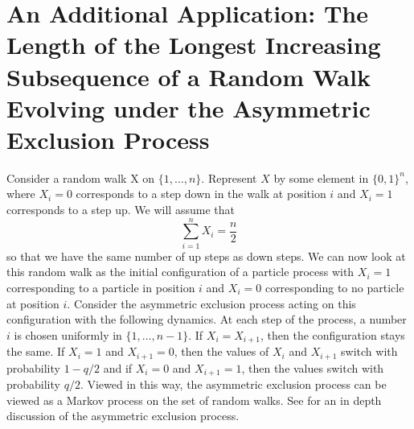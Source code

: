 \documentclass[12pt]{report}
\theoremstyle{definition}
\begin{document}
\section{An Additional Application: The Length of the Longest Increasing Subsequence of a Random Walk Evolving under the Asymmetric Exclusion Process}
Consider a random walk X on $\{1,\dots,n\}$.  Represent $X$ by some element in $\{0,1\}^n$, where  $X_i=0$ corresponds to a step down in the walk at position $i$ and $X_i=1$ corresponds to a step up.  We will assume that 
$$
\sum_{i=1}^n X_i =\frac{n}{2}
$$
so that we have the same number of up steps as down steps. 
We can now look at this random walk as the initial configuration of a particle process with $X_i=1$ corresponding to a particle in position $i$ and $X_i=0$ corresponding to no particle at position $i$.  Consider the asymmetric exclusion process acting on this configuration with the following dynamics.  At each step of the process, a number $i$ is chosen uniformly in $\{1,\dots,n-1\}$.  If $X_i=X_{i+1}$, then the configuration stays the same.  If $X_i=1$ and $X_{i+1}=0$, then the values of $X_i$ and $X_{i+1}$ switch with probability $1-q/2$ and if $X_i=0$ and $X_{i+1}=1$, then the values switch with probability $q/2$.  Viewed in this way, the asymmetric exclusion process can be viewed as a Markov process on the set of random walks.  See \cite{Liggett} for an in depth discussion of the asymmetric exclusion process.
\end{document}
